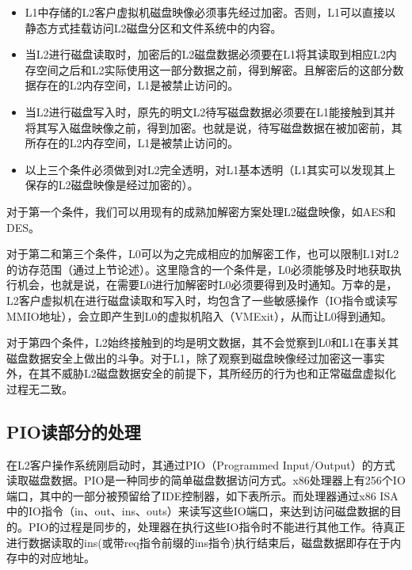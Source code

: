 \begin{itemize}
\item{L1中存储的L2客户虚拟机磁盘映像必须事先经过加密。否则，L1可以直接以静态方式挂载访问L2磁盘分区和文件系统中的内容。}
\item{当L2进行磁盘读取时，加密后的L2磁盘数据必须要在L1将其读取到相应L2内存空间之后和L2实际使用这一部分数据之前，得到解密。且解密后的这部分数据存在的L2内存空间，L1是被禁止访问的。}
\item{当L2进行磁盘写入时，原先的明文L2待写磁盘数据必须要在L1能接触到其并将其写入磁盘映像之前，得到加密。也就是说，待写磁盘数据在被加密前，其所存在的L2内存空间，L1是被禁止访问的。}
\item{以上三个条件必须做到对L2完全透明，对L1基本透明（L1其实可以发现其上保存的L2磁盘映像是经过加密的）。}
\end{itemize}

对于第一个条件，我们可以用现有的成熟加解密方案处理L2磁盘映像，如AES和DES。

对于第二和第三个条件，L0可以为之完成相应的加解密工作，也可以限制L1对L2的访存范围（通过上节论述）。这里隐含的一个条件是，L0必须能够及时地获取执行机会，也就是说，在需要L0进行加解密时L0必须要得到及时通知。万幸的是，L2客户虚拟机在进行磁盘读取和写入时，均包含了一些敏感操作（IO指令或读写MMIO地址），会立即产生到L0的虚拟机陷入（VMExit），从而让L0得到通知。

对于第四个条件，L2始终接触到的均是明文数据，其不会觉察到L0和L1在事关其磁盘数据安全上做出的斗争。对于L1，除了观察到磁盘映像经过加密这一事实外，在其不威胁L2磁盘数据安全的前提下，其所经历的行为也和正常磁盘虚拟化过程无二致。


\subsection{PIO读部分的处理}

在L2客户操作系统刚启动时，其通过PIO（Programmed Input/Output）的方式读取磁盘数据。PIO是一种同步的简单磁盘数据访问方式。x86处理器上有256个IO端口，其中的一部分被预留给了IDE控制器，如下表所示。而处理器通过x86 ISA中的IO指令（in、out、ins、outs）来读写这些IO端口，来达到访问磁盘数据的目的。PIO的过程是同步的，处理器在执行这些IO指令时不能进行其他工作。待真正进行数据读取的ins(或带req指令前缀的ins指令)执行结束后，磁盘数据即存在于内存中的对应地址。

